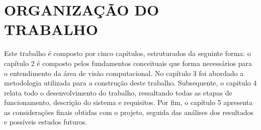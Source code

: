 \section{ORGANIZAÇÃO DO TRABALHO}

Este trabalho é composto por cinco capítulos, estruturados da seguinte forma: o capítulo 2 é composto pelos fundamentos conceituais que forma necessários para o entendimento da área de visão computacional. No capítulo 3 foi abordado a metodologia utilizada para a construção deste trabalho.  Subsequente, o capitulo 4 relata todo o desenvolvimento do trabalho, ressaltando todas as etapas de funcionamento, descrição do sistema e requisitos. Por fim, o capítulo 5 apresenta as considerações finais obtidas com o projeto, seguida das análises dos resultados e possíveis estudos futuros.